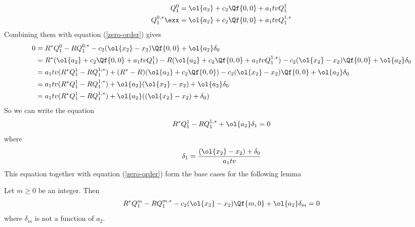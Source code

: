 \begin{align*}
   Q_1^0 &= \ol{a_2}+c_2\Qf{0,0} + a_1tvQ_1^1\\
   Q_1^{0,\ast} \exx&= \ol{a_2}+c_2\Qf{0,0} + a_1tvQ_1^{1,\ast}\\
\end{align*}
Combining them with equation (\ref{zero-order}) gives
\begin{align*}
0 &= R^\ast Q_1^0 -R Q_1^{0,\ast} - c_2(\ol{x_2}-x_2)\Qf{0,0} +\ol{a_2}\delta_0 \\
&= R^\ast ( \ol{a_2}+c_2\Qf{0,0} + a_1tvQ_1^1) -R (\ol{a_2}+c_2\Qf{0,0} + a_1tvQ_1^{1,\ast}) - c_2(\ol{x_2}-x_2)\Qf{0,0} +\ol{a_2}\delta_0\\
&=a_1tv(R^\ast Q_1^1-R Q_1^{1,\ast}) + (R^\ast-R)(\ol{a_2}+c_2\Qf{0,0}) - c_2(\ol{x_2}-x_2)\Qf{0,0} +\ol{a_2}\delta_0\\
& =a_1tv(R^\ast Q_1^1-R Q_1^{1,\ast})+\ol{a_2}(\ol{x_2}-x_2)+\ol{a_2}\delta_0\\
& =a_1tv(R^\ast Q_1^1-R Q_1^{1,\ast})+\ol{a_2}((\ol{x_2}-x_2)+\delta_0)
\end{align*}
So we can write the equation
\[
        R^\ast Q_1^1-R Q_1^{1,\ast}+\ol{a_2}\delta_1 = 0
\]
where
\[
   \delta_1 = \frac{(\ol{x_2}-x_2)+\delta_0}{a_1tv}
\]
This equation together with equation (\ref{zero-order}) form the base cases for the following lemma
\begin{lemma} Let $m\ge 0$ be an integer. Then
\begin{align}\label{coeff-eqn}
   R^\ast Q_1^m -R Q_1^{m,\ast} - c_2(\ol{x_2}-x_2)\Qf{m,0} +\ol{a_2}\delta_m = 0
\end{align}
where $\delta_m$ is not a function of $a_2$.
\end{lemma}
